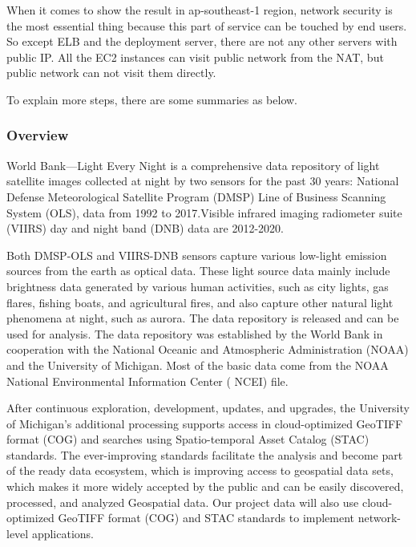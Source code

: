 \documentclass[conference]{IEEEtran}
\begin{document}
When it comes to show the result in ap-southeast-1 region, network security is the most essential thing because this part of service can be touched by end users. 
So except ELB and the deployment server, there are not any other servers with public IP. All the EC2 instances can visit public network from the NAT, but public network 
can not visit them directly.

To explain more steps, there are some summaries as below. 

	\subsubsection{Overview}
	World Bank---Light Every Night\cite{WorldBan13:online} is a comprehensive data repository of light satellite images collected at night by 
	two sensors for the past 30 years: National Defense Meteorological Satellite Program (DMSP) Line of Business Scanning 
	System (OLS), data from 1992 to 2017.Visible infrared imaging radiometer suite (VIIRS) day and night band (DNB) data are 2012-2020. 
	
	Both DMSP-OLS and VIIRS-DNB sensors capture various low-light emission sources from the earth as optical data. These light source 
	data mainly include brightness data generated by various human activities, such as city lights, gas flares, fishing boats, and 
	agricultural fires, and also capture other natural light phenomena at night, such as aurora. The data repository is released and 
	can be used for analysis. The data repository was established by the World Bank in cooperation with the National Oceanic and Atmospheric 
	Administration (NOAA) and the University of Michigan. Most of the basic data come from the NOAA National Environmental Information 
	Center ( NCEI) file.
	
	After continuous exploration, development, updates, and upgrades, the University of Michigan’s additional processing supports access 
	in cloud-optimized GeoTIFF format (COG) and searches using Spatio-temporal Asset Catalog (STAC) standards. The ever-improving standards 
	facilitate the analysis and become part of the ready data ecosystem, which is improving access to geospatial data sets, which makes it 
	more widely accepted by the public and can be easily discovered, processed, and analyzed Geospatial data. Our project data will also use 
	cloud-optimized GeoTIFF format (COG) and STAC standards to implement network-level applications.
\end{document}
